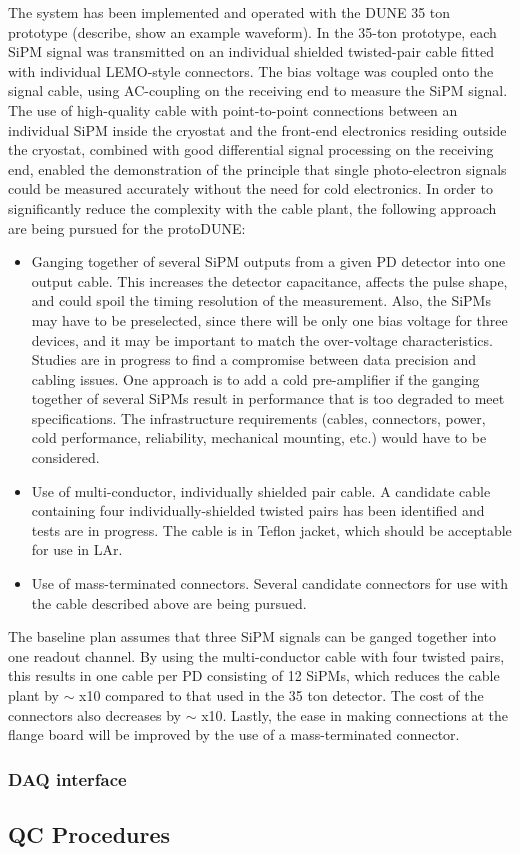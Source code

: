 The system has been implemented and operated with the DUNE 35 ton prototype 
(describe, show an example waveform).
%
In the 35-ton prototype, each SiPM signal was transmitted on an individual 
shielded twisted-pair cable fitted with individual LEMO-style connectors.  
The bias voltage was coupled onto the signal cable, using AC-coupling on 
the receiving end to measure the SiPM signal.  
The use of high-quality cable with point-to-point connections between an 
individual SiPM inside the cryostat and the front-end electronics residing 
outside the cryostat, combined with good differential signal processing on 
the receiving end, enabled the demonstration of the principle that single 
photo-electron signals could be measured accurately without the need for 
cold electronics.  
In order to significantly reduce the complexity with the cable plant, 
the following approach are being pursued for the protoDUNE:  
\begin{itemize}
\item Ganging together of several SiPM outputs from a given PD detector 
into one output cable.  
This increases the detector capacitance, affects the pulse shape, and
could spoil the timing resolution of the measurement.  
Also, the SiPMs may have to be preselected, since there will be only one 
bias voltage for three devices, and it may be important to match the 
over-voltage characteristics.  
Studies are in progress to find a compromise between data precision and 
cabling issues. 
One approach is to add a cold pre-amplifier if the ganging together of several 
SiPMs result in performance that is too degraded to meet specifications.  
The infrastructure requirements (cables, connectors, power, cold performance, 
reliability, mechanical mounting, etc.) would have to be considered.

\item Use of multi-conductor, individually shielded pair cable.  
A candidate cable containing four individually-shielded twisted pairs has been 
identified and tests are in progress.  
The cable is in Teflon jacket, which should be acceptable for use in LAr.

\item Use of mass-terminated connectors.  
Several candidate connectors for use with the cable described above are being pursued.
\end{itemize}

The baseline plan assumes that three SiPM signals can be ganged 
together into one readout channel. 
By using the multi-conductor cable with four twisted pairs, this 
results in one cable per PD consisting of 12 SiPMs, which reduces the 
cable plant by $\sim$ x10 compared to that used in the 35 ton detector.  
The cost of the connectors also decreases by $\sim$ x10.  
Lastly, the ease in making connections at the flange board will be improved 
by the use of a mass-terminated connector.      


\subsubsection{DAQ interface}


\subsection{QC Procedures}
